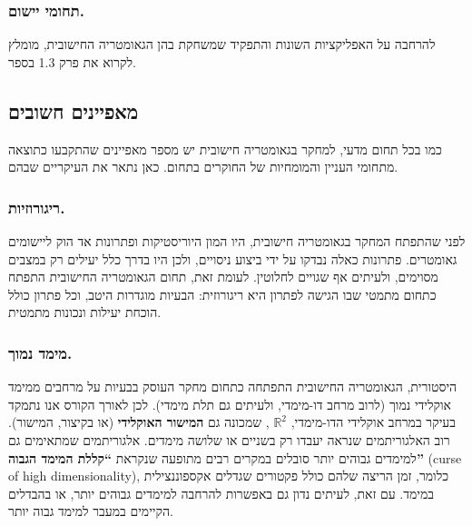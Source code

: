 \documentclass[
]{book}
\begin{document}
\hypertarget{ux5eaux5d7ux5d5ux5deux5d9-ux5d9ux5d9ux5e9ux5d5ux5dd.}{%
\subsubsection*{תחומי יישום.}\label{ux5eaux5d7ux5d5ux5deux5d9-ux5d9ux5d9ux5e9ux5d5ux5dd.}}

להרחבה על האפליקציות השונות והתפקיד שמשחקת בהן הגאומטריה החישובית, מומלץ לקרוא את פרק 1.3 בספר.

\hypertarget{basic-prop}{%
\subsection{מאפיינים חשובים}\label{basic-prop}}

כמו בכל תחום מדעי, למחקר בגאומטריה חישובית יש מספר מאפיינים שהתקבעו כתוצאה מתחומי העניין והמומחיות של החוקרים בתחום. כאן נתאר את העיקריים שבהם.

\hypertarget{ux5e8ux5d9ux5d2ux5d5ux5e8ux5d5ux5d6ux5d9ux5d5ux5ea.}{%
\subsubsection*{ריגורוזיות.}\label{ux5e8ux5d9ux5d2ux5d5ux5e8ux5d5ux5d6ux5d9ux5d5ux5ea.}}

לפני שהתפתח המחקר בגאומטריה חישובית, היו המון היוריסטיקות ופתרונות אד הוק ליישומים גאומטרים. פתרונות כאלה נבדקו על ידי ביצוע ניסויים, ולכן היו בדרך כלל יעילים רק במצבים מסוימים, ולעיתים אף שגויים לחלוטין. לעומת זאת, תחום הגאומטריה החישובית התפתח כתחום מתמטי שבו הגישה לפתרון היא ריגורוזית: הבעיות מוגדרות היטב, וכל פתרון כולל הוכחת יעילות ונכונות מתמטית.

\hypertarget{ux5deux5d9ux5deux5d3-ux5e0ux5deux5d5ux5da.}{%
\subsubsection*{מימד נמוך.}\label{ux5deux5d9ux5deux5d3-ux5e0ux5deux5d5ux5da.}}

היסטורית, הגאומטריה החישובית התפתחה כתחום מחקר העוסק בבעיות על מרחבים ממימד אוקלידי נמוך (לרוב מרחב דו-מימדי, ולעיתים גם תלת מימדי). לכן לאורך הקורס אנו נתמקד בעיקר במרחב אוקלידי הדו-מימדי, \(\mathbb{R}^2\) , שמכונה גם \textbf{המישור האוקלידי} (או בקיצור, המישור). רוב האלגוריתמים שנראה יעבדו רק בשניים או שלושה מימדים. אלגוריתמים שמתאימים גם למימדים גבוהים יותר סובלים במקרים רבים מתופעה שנקראת \textbf{``קללת המימד הגבוה''} (curse of high dimensionality), כלומר, זמן הריצה שלהם כולל פקטורים שגדלים אקספוננצילית במימד. עם זאת, לעיתים נדון גם באפשרות להרחבה למימדים גבוהים יותר, או בהבדלים הקיימים במעבר למימד גבוה יותר.
\end{document}
